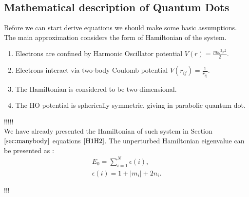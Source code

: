 \documentclass[twoside,english]{uiofysmaster}
\theoremstyle{definition}
\begin{document}
\subsection{Mathematical description of Quantum Dots}\label{sec:math_qd}
Before we can start derive equations we should make some basic assumptions. The main approximation considers the form of Hamiltonian of the system.\\
\begin{enumerate}
	\item Electrons are confined by  Harmonic Oscillator potential $V(r)=\frac{m\omega^2 r^2}{2}$.
	\item Electrons interact via two-body Coulomb potential  $V(r_{ij})=\frac{1}{r_{ij}}$.
	\item The Hamiltonian is considered to be two-dimensional.
	\item The HO potential is spherically symmetric, giving in parabolic quantum dot.
\end{enumerate}

!!!!!\\
We have already presented the Hamiltonian of such system in Section $\ref{sec:manybody}$ equations $\ref{H1H2}$. The unperturbed Hamiltonian eigenvalue can be presented as :
\begin{eqnarray}
E_0= \sum_{i=1}^{N}\epsilon(i),\\
\epsilon(i)= 1+|m_i|+ 2n_i.
\end{eqnarray}

!!!\\
\end{document}
